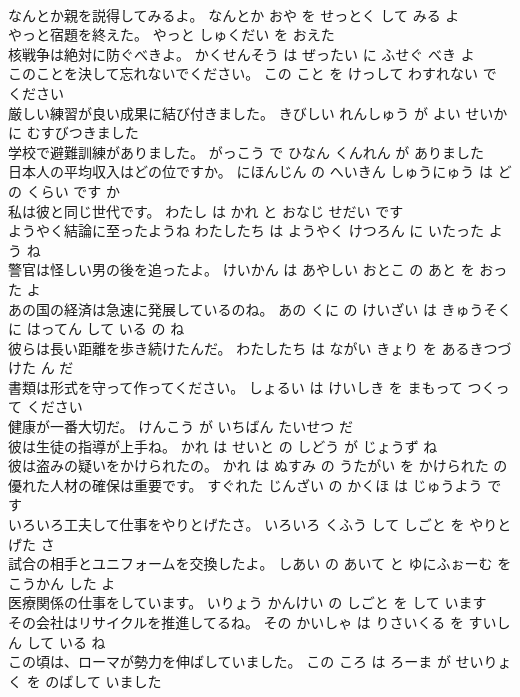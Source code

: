 \documentclass[8pt]{extreport}
\begin{document}
\begin{CJK}{UTF8}{min}
\\	なんとか親を説得してみるよ。	なんとか おや を せっとく して みる よ 
\\	やっと宿題を終えた。	やっと しゅくだい を おえた 
\\	核戦争は絶対に防ぐべきよ。	かくせんそう は ぜったい に ふせぐ べき よ 
\\	このことを決して忘れないでください。	この こと を けっして わすれない で ください 
\\	厳しい練習が良い成果に結び付きました。	きびしい れんしゅう が よい せいか に むすびつきました 
\\	学校で避難訓練がありました。	がっこう で ひなん くんれん が ありました 
\\	日本人の平均収入はどの位ですか。	にほんじん の へいきん しゅうにゅう は どの くらい です か 
\\	私は彼と同じ世代です。	わたし は かれ と おなじ せだい です 
\\	ようやく結論に至ったようね	わたしたち は ようやく けつろん に いたった よう ね 
\\	警官は怪しい男の後を追ったよ。	けいかん は あやしい おとこ の あと を おった よ 
\\	あの国の経済は急速に発展しているのね。	あの くに の けいざい は きゅうそく に はってん して いる の ね 
\\	彼らは長い距離を歩き続けたんだ。	わたしたち は ながい きょり を あるきつづけた ん だ 
\\	書類は形式を守って作ってください。	しょるい は けいしき を まもって つくって ください 
\\	健康が一番大切だ。	けんこう が いちばん たいせつ だ 
\\	彼は生徒の指導が上手ね。	かれ は せいと の しどう が じょうず ね 
\\	彼は盗みの疑いをかけられたの。	かれ は ぬすみ の うたがい を かけられた の 
\\	優れた人材の確保は重要です。	すぐれた じんざい の かくほ は じゅうよう です 
\\	いろいろ工夫して仕事をやりとげたさ。	いろいろ くふう して しごと を やりとげた さ 
\\	試合の相手とユニフォームを交換したよ。	しあい の あいて と ゆにふぉーむ を こうかん した よ 
\\	医療関係の仕事をしています。	いりょう かんけい の しごと を して います 
\\	その会社はリサイクルを推進してるね。	その かいしゃ は りさいくる を すいしん して いる ね 
\\	この頃は、ローマが勢力を伸ばしていました。	この ころ は ろーま が せいりょく を のばして いました 

\end{CJK}
\end{document}
